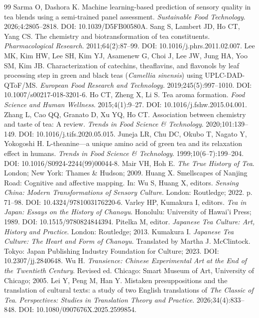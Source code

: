 \documentclass[numbers]{IntechOpen-Book}
\begin{document}
\begin{backmatter}
\begin{thebibliography}{99}
 Sarma O, Dashora K. Machine learning-based prediction of sensory quality in tea blends using a semi-trained panel assessment. \textit{Sustainable Food Technology}. 2026;4:2805--2818. DOI: 10.1039/D5FB00580A.
 Sang S, Lambert JD, Ho CT, Yang CS. The chemistry and biotransformation of tea constituents. \textit{Pharmacological Research}. 2011;64(2):87--99. DOI: 10.1016/j.phrs.2011.02.007.
 Lee MK, Kim HW, Lee SH, Kim YJ, Asamenew G, Choi J, Lee JW, Jung HA, Yoo SM, Kim JB. Characterization of catechins, theaflavins, and flavonols by leaf processing step in green and black teas (\textit{Camellia sinensis}) using UPLC-DAD-QToF/MS. \textit{European Food Research and Technology}. 2019;245(5):997--1010. DOI: 10.1007/s00217-018-3201-6.
 Ho CT, Zheng X, Li S. Tea aroma formation. \textit{Food Science and Human Wellness}. 2015;4(1):9--27. DOI: 10.1016/j.fshw.2015.04.001.
 Zhang L, Cao QQ, Granato D, Xu YQ, Ho CT. Association between chemistry and taste of tea: A review. \textit{Trends in Food Science \& Technology}. 2020;101:139--149. DOI: 10.1016/j.tifs.2020.05.015.
 Juneja LR, Chu DC, Okubo T, Nagato Y, Yokogoshi H. L-theanine---a unique amino acid of green tea and its relaxation effect in humans. \textit{Trends in Food Science \& Technology}. 1999;10(6--7):199--204. DOI: 10.1016/S0924-2244(99)00044-8.
 Mair VH, Hoh E. \textit{The True History of Tea}. London; New York: Thames \& Hudson; 2009.
 Huang X. Smellscapes of Nanjing Road: Cognitive and affective mapping. In: Wu S, Huang X, editors. \textit{Sensing China: Modern Transformations of Sensory Culture}. London: Routledge; 2022. p. 71--98. DOI: 10.4324/9781003176220-6.
 Varley HP, Kumakura I, editors. \textit{Tea in Japan: Essays on the History of Chanoyu}. Honolulu: University of Hawai'i Press; 1989. DOI: 10.1515/9780824844394.
 Pitelka M, editor. \textit{Japanese Tea Culture: Art, History and Practice}. London: Routledge; 2013.
 Kumakura I. \textit{Japanese Tea Culture: The Heart and Form of Chanoyu}. Translated by Martha J. McClintock. Tokyo: Japan Publishing Industry Foundation for Culture; 2023. DOI: 10.2307/jj.2840648.
 Wu H. \textit{Transience: Chinese Experimental Art at the End of the Twentieth Century}. Revised ed. Chicago: Smart Museum of Art, University of Chicago; 2005.
 Lei Y, Peng M, Han Y. Mistaken presuppositions and the translation of cultural texts: a study of two English translations of \textit{The Classic of Tea}. \textit{Perspectives: Studies in Translation Theory and Practice}. 2026;34(4):833--848. DOI: 10.1080/0907676X.2025.2599854.

\end{thebibliography}
\end{backmatter}
\end{document}
